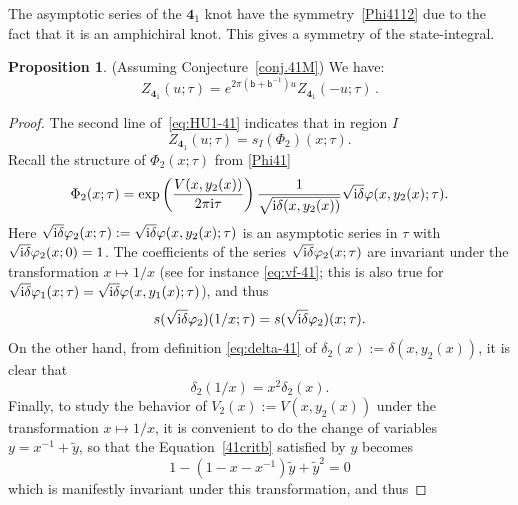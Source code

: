 \documentclass[12pt,reqno]{amsart}
\theoremstyle{definition}
\newtheorem{proposition}[theorem]{Proposition}
\def\ty{\tilde{y}}
\def\bb{\mathsf{b}}
\def\ri{\mathrm{i}}
\def\ri{{\rm i}}
\def\md{\mathbf}
\newcommand{\knot}[1]{\md{#1}}
\begin{document}
The asymptotic series of the $\knot{4}_1$ knot have the
symmetry~\eqref{Phi4112} due to the fact that it is an amphichiral
knot. This gives a symmetry of the state-integral.

\begin{proposition}
  \label{prop.Z41uu}
  (Assuming Conjecture~\ref{conj.41M}) We have:
  \begin{equation}
  \label{Z41uu}
  Z_{\knot{4}_1}(u;\tau) = e^{2\pi (\bb+\bb^{-1})u}
  Z_{\knot{4}_1}(-u;\tau) \,.
  \end{equation}
\end{proposition}

\begin{proof}
  The second line of~\eqref{eq:HU1-41} indicates that in region $I$
\begin{equation}
  Z_{\knot{4}_1}(u;\tau) = s_I(\Phi_2)(x;\tau).
\end{equation}
Recall the structure of $\Phi_2(x;\tau)$ from \eqref{Phi41}
\begin{equation}
  \Phi_2(x;\tau) = \exp\left(\frac{V(x,y_2(x))}{2\pi\ri\tau}\right)
  \frac{1}{\sqrt{\ri\delta(x,y_2(x))}}
  \sqrt{\ri\delta}\varphi(x,y_2(x);\tau).
\end{equation}
Here
$\sqrt{\ri\delta}\varphi_2(x;\tau):=\sqrt{\ri\delta}\varphi(x,y_2(x);\tau)$
is an asymptotic series in $\tau$ with
$\sqrt{\ri\delta}\varphi_2(x;0)=1$.  The coefficients of the series
$\sqrt{\ri\delta}\varphi_2(x;\tau)$ are invariant under the
transformation $x\mapsto 1/x$ (see for instance \eqref{eq:vf-41}; this
is also true for
$\sqrt{\ri\delta}\varphi_1(x;\tau) =
\sqrt{\ri\delta}\varphi(x,y_1(x);\tau)$), and thus
\begin{equation}
  s(\sqrt{\ri\delta} \varphi_2)(1/x;\tau) = s(\sqrt{\ri\delta}
  \varphi_2)(x;\tau).
  \label{eq:-xphi}
\end{equation}
On the other hand, from definition \eqref{eq:delta-41} of
$\delta_2(x):=\delta(x,y_2(x))$, it is clear that
\begin{equation}
  \delta_2(1/x) = x^2\delta_2(x).
  \label{eq:-xdelta}
\end{equation}
Finally, to study the behavior of $V_2(x):=V(x,y_2(x))$ under the
transformation $x\mapsto 1/x$, it is convenient to do the change of
variables $y = x^{-1}+\ty$, so that the Equation~\eqref{41critb}
satisfied by $y$ becomes
\begin{equation}
  1-(1-x-x^{-1})\ty+\ty^2 = 0
\end{equation}
which is manifestly invariant under this transformation, and thus

\end{proof}
\end{document}
